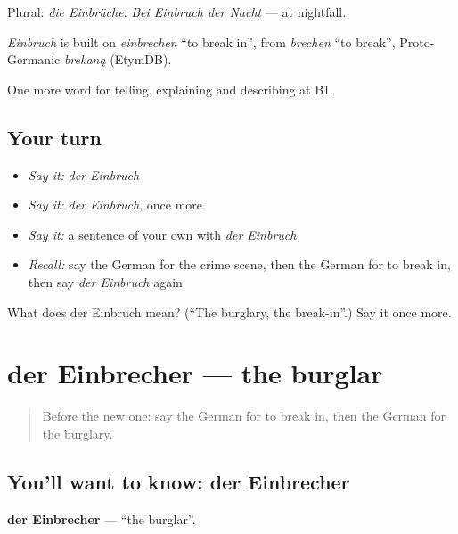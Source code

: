 Plural: \emph{die Einbrüche}. \emph{Bei Einbruch der Nacht} — at nightfall.

\begin{cousinweb}
\emph{Einbruch} is built on \emph{einbrechen} \textquotedblleft{}to break in\textquotedblright{}, from \emph{brechen} \textquotedblleft{}to break\textquotedblright{}, Proto-Germanic \emph{brekaną} (EtymDB).
\end{cousinweb}

\begin{grammarlens}[title={What you've built}]
One more word for telling, explaining and describing at B1.
\end{grammarlens}

\subsection*{Your turn}
\begin{itemize}
\raggedright
  \item \emph{Say it:} \emph{der Einbruch}
  \item \emph{Say it:} \emph{der Einbruch}, once more
  \item \emph{Say it:} a sentence of your own with \emph{der Einbruch}
  \item \emph{Recall:} say the German for the crime scene, then the German for to break in, then say \emph{der Einbruch} again
\end{itemize}

\begin{tcolorbox}[breakable,colback=teal!4,colframe=teal!35!black,title={Before you move on}]
What does der Einbruch mean? (\textquotedblleft{}The burglary, the break-in\textquotedblright{}.) Say it once more.
\end{tcolorbox}
\section[der Einbrecher]{der Einbrecher — the burglar}

\label{lesson:GE-C281-einbrecher}



\begin{quote}
Before the new one: say the German for to break in, then the German for the burglary.
\end{quote}

\subsection*{You'll want to know: der Einbrecher}
\textbf{der Einbrecher} — \textquotedblleft{}the burglar\textquotedblright{}.

